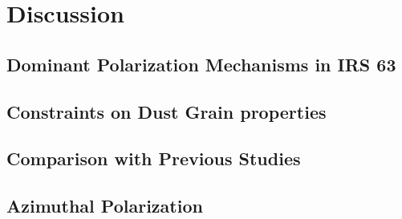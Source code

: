 \chapter{Discussion}
\label{ch_discussion}



\section{Dominant Polarization Mechanisms in IRS 63}





\section{Constraints on Dust Grain properties}

\section{Comparison with Previous Studies}


\section{Azimuthal Polarization}
\label{sec: discussion_azimuthal_polarization}
















